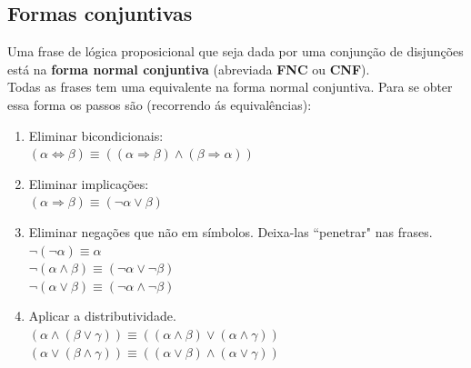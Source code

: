 \documentclass[]{report}
\begin{document}
\subsection{Formas conjuntivas}
Uma frase de lógica proposicional que seja dada por uma conjunção de disjunções está na \textbf{forma normal conjuntiva} (abreviada \textbf{FNC} ou \textbf{CNF}).\\
Todas as frases tem uma equivalente na forma normal conjuntiva. Para se obter essa forma os passos são (recorrendo ás equivalências):
\begin{enumerate}
\item Eliminar bicondicionais:\\
$(\alpha \Leftrightarrow \beta) \equiv ((\alpha \Rightarrow \beta) \wedge (\beta \Rightarrow \alpha))$
\item Eliminar implicações:\\
$(\alpha \Rightarrow \beta) \equiv (\neg \alpha \vee \beta)$
\item Eliminar negações que não em símbolos. Deixa-las ``penetrar" nas frases.\\
$\neg(\neg \alpha) \equiv \alpha$\\
$\neg(\alpha \wedge \beta) \equiv (\neg \alpha \vee \neg \beta)$\\
$\neg(\alpha \vee \beta) \equiv (\neg \alpha \wedge \neg \beta)$
\item Aplicar a distributividade.\\
$(\alpha \wedge (\beta \vee \gamma)) \equiv ((\alpha \wedge \beta) \vee (\alpha \wedge \gamma))$\\
$(\alpha \vee (\beta \wedge \gamma)) \equiv ((\alpha \vee \beta) \wedge (\alpha \vee \gamma))$
\end{enumerate}
\pagebreak
\end{document}
